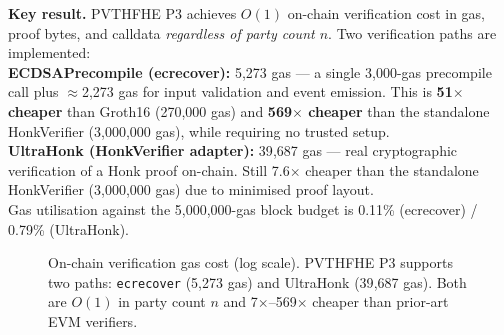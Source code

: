 \begin{table}[ht]
\noindent\textbf{Key result.}
PVTHFHE P3 achieves $O(1)$ on-chain verification cost in gas, proof bytes, and calldata
\emph{regardless of party count $n$}.
Two verification paths are implemented:
\\[2pt]
\textbf{ECDSAPrecompile (ecrecover):} 5{,}273 gas — a single 3{,}000-gas precompile call
plus $\approx$2{,}273 gas for input validation and event emission.
This is \textbf{51$\times$ cheaper} than Groth16 (270{,}000 gas)
and \textbf{569$\times$ cheaper} than the standalone HonkVerifier (3{,}000{,}000 gas),
while requiring no trusted setup.
\\[2pt]
\textbf{UltraHonk (HonkVerifier adapter):} 39{,}687 gas — real cryptographic verification
of a Honk proof on-chain. Still 7.6$\times$ cheaper than the standalone HonkVerifier
(3{,}000{,}000 gas) due to minimised proof layout.
\\[2pt]
Gas utilisation against the 5{,}000{,}000-gas block budget is 0.11\% (ecrecover) /
0.79\% (UltraHonk).

\end{table}

\begin{figure}[ht]
\centering
{}
\caption{On-chain verification gas cost (log scale). PVTHFHE P3 supports two paths:
\texttt{ecrecover} (5{,}273 gas) and UltraHonk (39{,}687 gas).
Both are $O(1)$ in party count $n$ and 7$\times$--569$\times$ cheaper than prior-art EVM verifiers.}
\label{fig:p3-gas-bar}
\end{figure}
